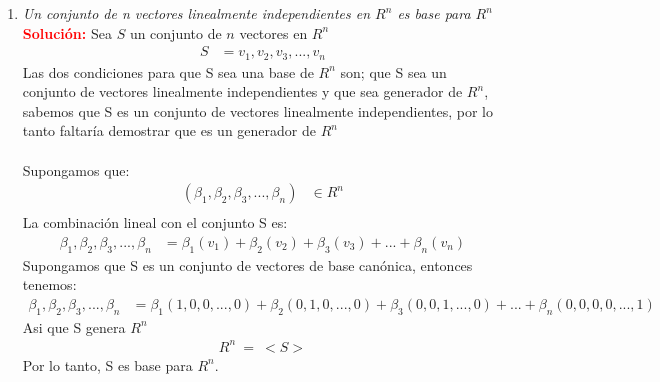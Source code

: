 \documentclass[12pt]{article}
\begin{document}
\begin{enumerate}
\item \textit{Un conjunto de n vectores linealmente independientes en $R^{n}$ es base para $R^{n}$} \\ 
\noindent \textcolor{red}{\bf Solución:}
    Sea $S$ un conjunto de $n$ vectores en $R^{n}$ \\
\begin {equation*} \begin {split}
    S &= {v_{1},v_{2},v_{3}, ..., v_{n}} 
\end {split} \end {equation*} 
Las dos condiciones para que S sea una base de $R^{n}$ son; que S sea un conjunto de vectores linealmente independientes y que sea generador de $R^{n}$, sabemos que S es un conjunto de vectores linealmente independientes, por lo tanto faltaría demostrar que es un generador de $R^{n}$ \\ \\ 
Supongamos que: 
\begin {equation*}
\begin {split}
 (\beta_{1}, \beta_{2}, \beta_{3}, ..., \beta_{n}) &\in R^{n} \\
 \end {split}
 \end {equation*} 
La combinación lineal con el conjunto S es: \\ 
 \begin {equation*} \begin {split}
\beta_{1}, \beta_{2}, \beta_{3}, ..., \beta_{n} &= \beta_{1}(v_{1}) + \beta_{2}(v_{2}) + \beta_{3}(v_{3}) + ... + \beta_{n}(v_{n}) 
\end {split} \end {equation*} 
Supongamos que S es un conjunto de vectores de base canónica, entonces tenemos: 
\begin {equation*} \begin {split}
\beta_{1}, \beta_{2}, \beta_{3}, ..., \beta_{n} &= \beta_{1}(1,0,0,...,0) + \beta_{2}(0,1,0,...,0) + \beta_{3}(0,0,1,...,0) + ... + \beta_{n}(0,0,0,0,...,1) 
\end {split} \end {equation*} 
Asi que S genera $R^{n}$ 
\begin {equation*} \begin {split}
R^{n} \ = \ <S>
\end {split} \end {equation*} 
Por lo tanto, S es base para $R^{n}$.


\end{enumerate}
\end{document}

